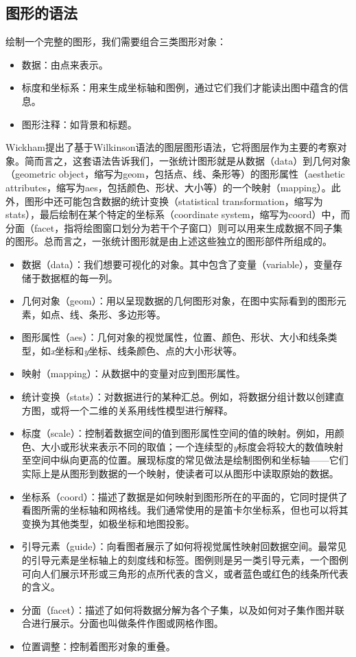 \documentclass[11pt,a4paper,twoside]{book}
\begin{document}
\subsection{图形的语法}
绘制一个完整的图形，我们需要组合三类图形对象：
\begin{itemize}
  \item 数据：由点来表示。
  \item 标度和坐标系：用来生成坐标轴和图例，通过它们我们才能读出图中蕴含的信息。
  \item 图形注释：如背景和标题。
\end{itemize}

Wickham提出了基于Wilkinson语法的图层图形语法，它将图层作为主要的考察对象。简而言之，这套语法告诉我们，一张统计图形就是从数据（data）到几何对象（geometric object，缩写为geom，包括点、线、条形等）的图形属性（aesthetic attributes，缩写为aes，包括颜色、形状、大小等）的一个映射（mapping）。此外，图形中还可能包含数据的统计变换（statistical transformation，缩写为stats），最后绘制在某个特定的坐标系（coordinate system，缩写为coord）中，而分面（facet，指将绘图窗口划分为若干个子窗口）则可以用来生成数据不同子集的图形。总而言之，一张统计图形就是由上述这些独立的图形部件所组成的。

\begin{itemize}
  \item 数据（data）：我们想要可视化的对象。其中包含了变量（variable），变量存储于数据框的每一列。
  \item 几何对象（geom）：用以呈现数据的几何图形对象，在图中实际看到的图形元素，如点、线、条形、多边形等。
  \item 图形属性（aes）：几何对象的视觉属性，位置、颜色、形状、大小和线条类型，如\textit{x}坐标和\textit{y}坐标、线条颜色、点的大小形状等。
  \item 映射（mapping）：从数据中的变量对应到图形属性。
  \item 统计变换（stats）：对数据进行的某种汇总。例如，将数据分组计数以创建直方图，或将一个二维的关系用线性模型进行解释。
  \item 标度（scale）：控制着数据空间的值到图形属性空间的值的映射。例如，用颜色、大小或形状来表示不同的取值；一个连续型的\textit{y}标度会将较大的数值映射至空间中纵向更高的位置。展现标度的常见做法是绘制图例和坐标轴——它们实际上是从图形到数据的一个映射，使读者可以从图形中读取原始的数据。
  \item 坐标系（coord）：描述了数据是如何映射到图形所在的平面的，它同时提供了看图所需的坐标轴和网格线。我们通常使用的是笛卡尔坐标系，但也可以将其变换为其他类型，如极坐标和地图投影。
  \item 引导元素（guide）：向看图者展示了如何将视觉属性映射回数据空间。最常见的引导元素是坐标轴上的刻度线和标签。图例则是另一类引导元素，一个图例可向人们展示环形或三角形的点所代表的含义，或者蓝色或红色的线条所代表的含义。
  \item 分面（facet）：描述了如何将数据分解为各个子集，以及如何对子集作图并联合进行展示。分面也叫做条件作图或网格作图。
  \item 位置调整：控制着图形对象的重叠。
\end{itemize}
\end{document}
